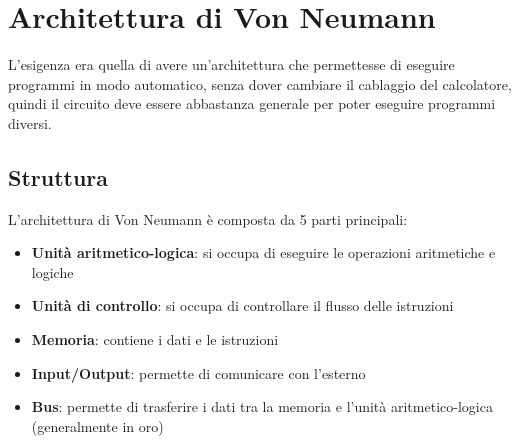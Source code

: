 \documentclass[a4paper]{article}
\theoremstyle{break}
\theoremstyle{break}
\theoremstyle{break}
\theoremstyle{break}
\begin{document}


\tableofcontents
\pagebreak

\section{Architettura di Von Neumann}
L'esigenza era quella di avere un'architettura che permettesse di eseguire programmi
in modo automatico, senza dover cambiare il cablaggio del calcolatore, quindi il circuito
deve essere abbastanza generale per poter eseguire programmi diversi.

\subsection{Struttura}
L'architettura di Von Neumann è composta da 5 parti principali:
\begin{itemize}
	\item \textbf{Unità aritmetico-logica}: si occupa di eseguire le operazioni aritmetiche e logiche
	\item \textbf{Unità di controllo}: si occupa di controllare il flusso delle istruzioni
	\item \textbf{Memoria}: contiene i dati e le istruzioni
	\item \textbf{Input/Output}: permette di comunicare con l'esterno
	\item \textbf{Bus}: permette di trasferire i dati tra la memoria e l'unità aritmetico-logica (generalmente in oro)
\end{itemize}

\begin{figure}[H]
	\centering
\end{figure}
\end{document}
